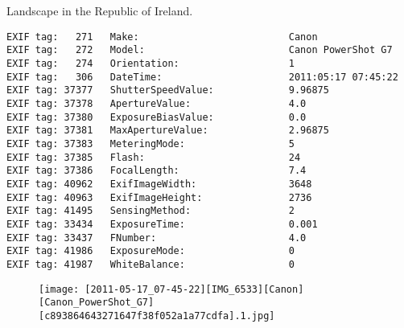 \section{\protect{}}
\noindent Landscape in the Republic of Ireland.
\noindent
\begin{lstlisting}
EXIF tag:   271   Make:                          Canon
EXIF tag:   272   Model:                         Canon PowerShot G7
EXIF tag:   274   Orientation:                   1
EXIF tag:   306   DateTime:                      2011:05:17 07:45:22
EXIF tag: 37377   ShutterSpeedValue:             9.96875
EXIF tag: 37378   ApertureValue:                 4.0
EXIF tag: 37380   ExposureBiasValue:             0.0
EXIF tag: 37381   MaxApertureValue:              2.96875
EXIF tag: 37383   MeteringMode:                  5
EXIF tag: 37385   Flash:                         24
EXIF tag: 37386   FocalLength:                   7.4
EXIF tag: 40962   ExifImageWidth:                3648
EXIF tag: 40963   ExifImageHeight:               2736
EXIF tag: 41495   SensingMethod:                 2
EXIF tag: 33434   ExposureTime:                  0.001
EXIF tag: 33437   FNumber:                       4.0
EXIF tag: 41986   ExposureMode:                  0
EXIF tag: 41987   WhiteBalance:                  0

\end{lstlisting}
\clearpage
\begin{figure}
\raggedleft
\texttt{[image: [2011-05-17\_07-45-22][IMG\_6533][Canon][Canon\_PowerShot\_G7][c893864643271647f38f052a1a77cdfa].1.jpg]}
\end{figure}


\clearpage
